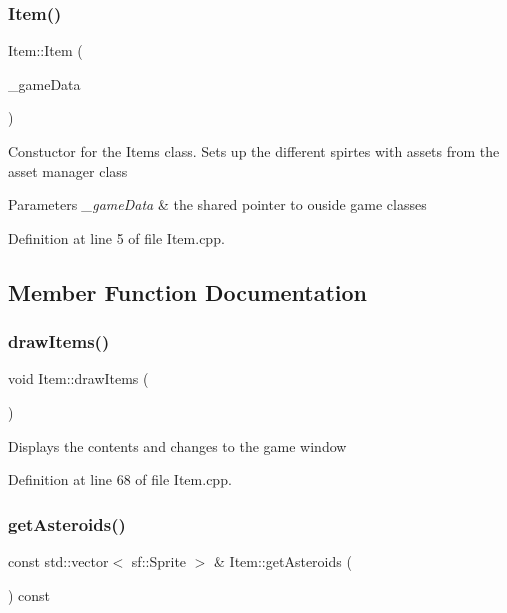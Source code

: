 \subsubsection{\texorpdfstring{Item()}{Item()}}
{\footnotesize\ttfamily Item\+::\+Item (\begin{DoxyParamCaption}\item[{\mbox{\hyperlink{_engine_8h_a5bbe002e9f7f45a67e8fda9dbe980a3f}{Game\+Data}}}]{\+\_\+game\+Data }\end{DoxyParamCaption})\hspace{0.3cm}{\ttfamily [explicit]}}

Constuctor for the Items class. Sets up the different spirtes with assets from the asset manager class 
\begin{DoxyParams}{Parameters}
{\em \+\_\+game\+Data} & the shared pointer to ouside game classes \\
\hline
\end{DoxyParams}


Definition at line 5 of file Item.\+cpp.



\subsection{Member Function Documentation}
\mbox{\label{class_item_a468f79141232febc578c8cefe32b2791}} 
\subsubsection{\texorpdfstring{drawItems()}{drawItems()}}
{\footnotesize\ttfamily void Item\+::draw\+Items (\begin{DoxyParamCaption}{ }\end{DoxyParamCaption})}

Displays the contents and changes to the game window 

Definition at line 68 of file Item.\+cpp.

\mbox{\label{class_item_a040b4ff526f1ab5340b3a7ea630037ba}} 
\subsubsection{\texorpdfstring{getAsteroids()}{getAsteroids()}}
{\footnotesize\ttfamily const std\+::vector$<$ sf\+::\+Sprite $>$ \& Item\+::get\+Asteroids (\begin{DoxyParamCaption}{ }\end{DoxyParamCaption}) const}

